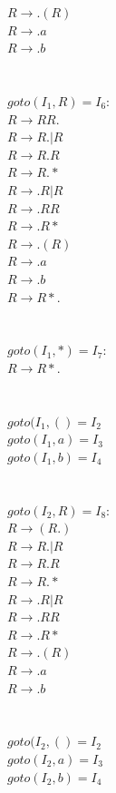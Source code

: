 \documentclass[10pt]{letter}
\begin{document}
\begin{enumerate}
$R \rightarrow .(R)$\\
$R \rightarrow .a$\\
$R \rightarrow .b$\\
\\
\\
$goto(I_{1},R)=I_{6}:$\\
$R \rightarrow RR.$\\
$R \rightarrow R.|R$\\
$R \rightarrow R.R$\\
$R \rightarrow R.*$\\
$R \rightarrow .R|R$\\
$R \rightarrow .RR$\\
$R \rightarrow .R*$\\
$R \rightarrow .(R)$\\
$R \rightarrow .a$\\
$R \rightarrow .b$\\
$R \rightarrow R*.$\\
\\
\\
$goto(I_{1},*)=I_{7}:$\\
$R \rightarrow R*.$\\
\\
\\
$goto(I_{1},()=I_{2}$\\
$goto(I_{1},a)=I_{3}$\\
$goto(I_{1},b)=I_{4}$\\
\\
\\
$goto(I_{2},R)=I_{8}:$\\
$R \rightarrow (R.)$\\
$R \rightarrow R.|R$\\
$R \rightarrow R.R$\\
$R \rightarrow R.*$\\
$R \rightarrow .R|R$\\
$R \rightarrow .RR$\\
$R \rightarrow .R*$\\
$R \rightarrow .(R)$\\
$R \rightarrow .a$\\
$R \rightarrow .b$\\
\\
\\
$goto(I_{2},()=I_{2}$\\
$goto(I_{2},a)=I_{3}$\\
$goto(I_{2},b)=I_{4}$\\
\\

\end{enumerate}
\end{document}
